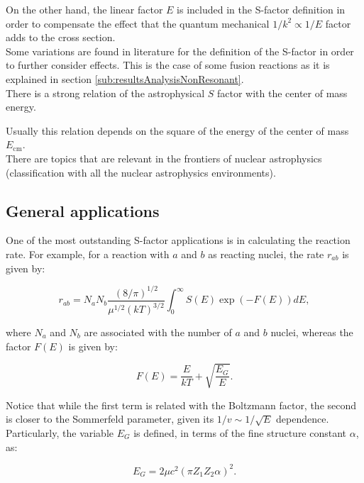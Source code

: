 \documentclass[openany]{book}
\begin{document}
On the other hand, the linear factor $E$ is included in the S-factor definition in order to compensate the effect that the quantum mechanical $1/k^2 \propto 1/E$ factor adds to the cross section. \\

Some variations are found in literature for the definition of the S-factor in order to further consider effects. This is the case of some fusion reactions as it is explained in section \ref{sub:resultsAnalysisNonResonant}. \\

There is a strong relation of the astrophysical $S$ factor with the center of mass energy. 

Usually this relation depends on the square of the energy of the center of mass $E_{\mathrm{cm}}$. \\

There are topics that are relevant in the frontiers of nuclear astrophysics  \cite{bertulani_kajino_2016} (classification with all the nuclear astrophysics environments). 

\subsection{General applications} \label{sub:sfactorApplications}

One of the most outstanding S-factor applications is in calculating the reaction rate. For example, for a reaction with $a$ and $b$ as reacting nuclei, the rate $r_{ab}$ is given by:

\begin{equation}\label{eq:sfactor_reactionRate}
	r_{ab} = N_aN_b \frac{(8/\pi)^{1/2}}{\mu^{1/2}(kT)^{3/2}} \int_0^{\infty} {S(E) \exp {(-F(E))} dE},
\end{equation} 

where $N_a$ and $N_b$ are associated with the number of $a$ and $b$ nuclei, whereas the factor $F(E)$ is given by: 

\begin{equation}\label{eq:sfactor_Ffactor}
	F(E) = \frac{E}{kT} + \sqrt{\frac{E_G}{E}}.
\end{equation}

Notice that while the first term is related with the Boltzmann factor, the second is closer to the Sommerfeld parameter, given its $1/v \sim 1/\sqrt{E}$ dependence. Particularly, the variable $E_G$ is defined, in terms of the fine structure constant $\alpha$, as: 

\begin{equation}\label{eq:sfactor_Eg}
	E_G = 2\mu c^2 (\pi Z_1 Z_2 \alpha)^2.
\end{equation}
\end{document}
